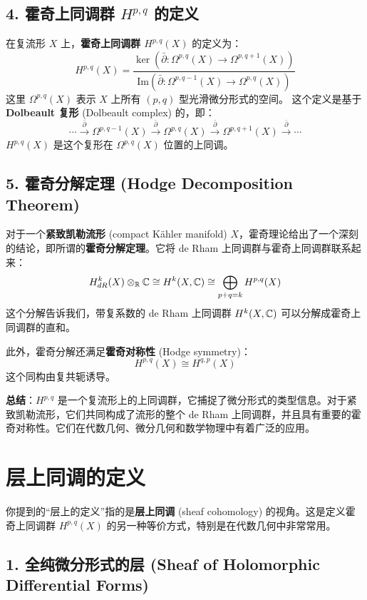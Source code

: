 \documentclass{amsart}
\let\originalmathbb\mathbb
\renewcommand{\mathbb}[1]{%
    \ifstrequal{#1}{1}{\mathbbm{#1}}{\originalmathbb{#1}}%
}
\theoremstyle{plain}
\theoremstyle{definition}
\theoremstyle{remark}
\begin{document}
\subsection{4. 霍奇上同调群 \texorpdfstring{$H^{p,q}$}{H^p,q} 的定义}

在复流形 $X$ 上，\textbf{霍奇上同调群 $H^{p,q}(X)$} 的定义为：
\[
H^{p,q}(X) = \frac{\ker(\bar{\partial}: \Omega^{p,q}(X) \to \Omega^{p,q+1}(X))}{\mathrm{Im}(\bar{\partial}: \Omega^{p,q-1}(X) \to \Omega^{p,q}(X))}
\]
这里 $\Omega^{p,q}(X)$ 表示 $X$ 上所有 $(p,q)$ 型光滑微分形式的空间。
这个定义是基于\textbf{Dolbeault 复形} (Dolbeault complex) 的，即：
\[
\cdots \xrightarrow{\bar{\partial}} \Omega^{p,q-1}(X) \xrightarrow{\bar{\partial}} \Omega^{p,q}(X) \xrightarrow{\bar{\partial}} \Omega^{p,q+1}(X) \xrightarrow{\bar{\partial}} \cdots
\]
$H^{p,q}(X)$ 是这个复形在 $\Omega^{p,q}(X)$ 位置的上同调。

\subsection{5. 霍奇分解定理 (Hodge Decomposition Theorem)}

对于一个\textbf{紧致凯勒流形} (compact Kähler manifold) $X$，霍奇理论给出了一个深刻的结论，即所谓的\textbf{霍奇分解定理}。它将 de Rham 上同调群与霍奇上同调群联系起来：
\[
H^k_{dR}(X) \otimes_{\mathbb{R}} \mathbb{C} \cong H^k(X, \mathbb{C}) \cong \bigoplus_{p+q=k} H^{p,q}(X)
\]
这个分解告诉我们，带复系数的 de Rham 上同调群 $H^k(X, \mathbb{C})$ 可以分解成霍奇上同调群的直和。

此外，霍奇分解还满足\textbf{霍奇对称性} (Hodge symmetry)：
\[
H^{p,q}(X) \cong H^{q,p}(X)
\]
这个同构由复共轭诱导。

\textbf{总结}：$H^{p,q}$ 是一个复流形上的上同调群，它捕捉了微分形式的类型信息。对于紧致凯勒流形，它们共同构成了流形的整个 de Rham 上同调群，并且具有重要的霍奇对称性。它们在代数几何、微分几何和数学物理中有着广泛的应用。

\section{层上同调的定义}

你提到的“层上的定义”指的是\textbf{层上同调} (sheaf cohomology) 的视角。这是定义霍奇上同调群 $H^{p,q}(X)$ 的另一种等价方式，特别是在代数几何中非常常用。

\subsection{1. 全纯微分形式的层 (Sheaf of Holomorphic Differential Forms)}
\end{document}
